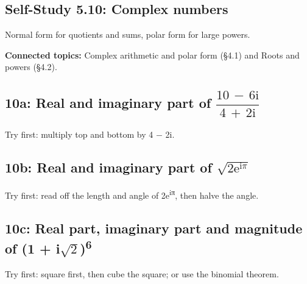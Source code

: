 \documentclass[11pt]{article}
\begin{document}
\begin{keepsection}
\section{Self-Study 5.10: Complex numbers}

Normal form for quotients and sums, polar form for large powers.

\textbf{Connected topics:} Complex arithmetic and polar form (§4.1) and Roots and powers (§4.2).

\begin{keepsection}
\subsection{10a: Real and imaginary part of {\small\ensuremath{\dfrac{10\, -\, 6\mathrm{i}}{4\, +\, 2\mathrm{i}}}}}

Try first: multiply top and bottom by 4 \ensuremath{-} 2i.

\end{keepsection}

\begin{keepsection}
\subsection{10b: Real and imaginary part of \ensuremath{\sqrt{2\mathrm{e}^{\mathrm{i}π}}}}

Try first: read off the length and angle of 2e\textsuperscript{iπ}, then halve the angle.

\end{keepsection}

\begin{keepsection}
\subsection{10c: Real part, imaginary part and magnitude of (1 + i\ensuremath{\sqrt{2}})\textsuperscript{6}}

Try first: square first, then cube the square; or use the binomial theorem.


\end{keepsection}
\end{keepsection}
\end{document}
